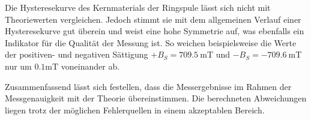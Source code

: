 Die Hysteresekurve des Kernmaterials der Ringspule lässt sich nicht mit Theoriewerten vergleichen. Jedoch stimmt sie mit dem allgemeinen Verlauf einer Hysteresekurve gut
überein und weist eine hohe Symmetrie auf, was ebenfalls ein Indikator für die Qualität der Messung ist. So weichen beispielsweise die Werte der positiven- und negativen 
Sättigung $+B_S = 709.5 \: \unit{\milli\tesla}$ und $-B_S = -709.6 \: \unit{\milli\tesla}$ nur um $0.1 \unit{\milli\tesla}$ voneinander ab. 


Zusammenfassend lässt sich festellen, dass die Messergebnisse im Rahmen der Messgenauigkeit mit der Theorie übereinstimmen. Die berechneten
Abweichungen liegen trotz der möglichen Fehlerquellen in einem akzeptablen Bereich. 
